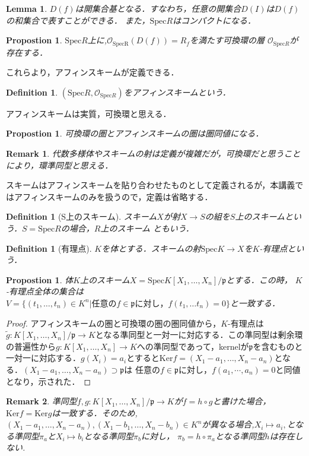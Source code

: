 \documentclass{ujarticle}
\newtheorem{dfn}[thm]{Definition}
\newtheorem{prop}[thm]{Propostion}
\newtheorem{lem}[thm]{Lemma}
\newtheorem*{rem}{Remark}
\begin{document}
\begin{lem}
 $D(f)$は開集合基となる．すなわち，任意の開集合$D(I)$は$D(f)$の和集合で表すことができる．
 また，$\mathrm{Spec}R$はコンパクトになる．
\end{lem}

\begin{prop}
 $\mathrm{Spec}R$上に,$\mathcal{O}_{\mathrm{SpecR}}(D(f))=R_f$を満たす可換環の層
 $\mathcal{O}_{\mathrm{Spec}R}$が存在する．
\end{prop}
これらより，アフィンスキームが定義できる．
\begin{dfn}
 $(\mathrm{Spec}R,\mathcal{O}_{\mathrm{Spec}R})$をアフィンスキームという．
\end{dfn}
アフィンスキームは実質，可換環と思える．
\begin{prop}
 可換環の圏とアフィンスキームの圏は圏同値になる．
\end{prop}
\begin{rem}
 代数多様体やスキームの射は定義が複雑だが，可換環だと思うことにより，環準同型と思える．
\end{rem}
スキームはアフィンスキームを貼り合わせたものとして定義されるが，本講義ではアフィンスキームのみを扱うので，定義は省略する．

\begin{dfn}[S上のスキーム]
  スキーム$X$が射$X \to S$の組を$S$上のスキームという．$S=\mathrm{Spec}R$の場合，$R$上のスキーム
  ともいう．
\end{dfn}

\begin{dfn}[有理点]
  $K$を体とする．スキームの射$\mathrm{Spec}K \to X$を$K$-有理点という．
\end{dfn}
\begin{prop}
 体$K$上のスキーム$X=\mathrm{Spec}K[X_1,\dots,X_n]/\mathfrak{p}$とする．この時，
 $K$-有理点全体の集合は$V=\{(t_1,\dots,t_n) \in K^n | \mbox{任意の}f \in \mathfrak{p} \mbox{に対し，}f(t_1, \dots t_n)=0  \} $と一致する．
\end{prop}
\begin{proof}
アフィンスキームの圏と可換環の圏の圏同値から，$K$-有理点は$\tilde{g}:K[X_1,\dots,X_n]/\mathfrak{p} \to K$となる準同型と一対一に対応する．この準同型は剰余環の普遍性から$g:K[X_1,\dots,X_n] \to K$への準同型であって，kernelが$\mathfrak{p}$を含むものと一対一に対応する．$g(X_i)=a_i$とすると$\mathrm{Ker}f=(X_1 -a_1, \dots,X_n -a_n)$となる．$(X_1 -a_1, \dots,X_n -a_n) \supset \mathfrak{p}$は
任意の$f \in  \mathfrak{p}$に対し，$f(a_1,\cdots,a_n)=0$と同値となり，示された．
\end{proof}
\begin{rem}
 準同型$f,g: K[X_1,\dots,X_n]/\mathfrak{p} \to K$が$f=h \circ g$と書けた場合，$\mathrm{Ker}f = \mathrm{Ker}g$は一致する．そのため,$(X_1 - a_1,\dots,X_n - a_n),(X_1 - b_1,\dots,X_n - b_n) \in K^n$が異なる場合,$X_i \mapsto a_i,$となる準同型$\pi_a$と$X_i \mapsto b_i$となる準同型$\pi_b$に対し，
 $\pi_b = h \circ \pi_a$となる準同型$h$は存在しない.
\end{rem}
\end{document}
